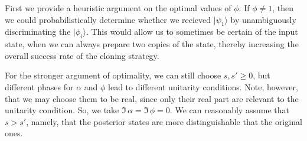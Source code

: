 \documentclass[aps,prl,twocolumn,eqsecnum,showpacs]{revtex4}
\newcommand{\ke}[1]{|#1\rangle}
\begin{document}
First we provide a heuristic argument on the optimal values of $\phi$.  If $\phi \neq 1$, then we could probabilistically determine whether we recieved $\ke{\psi_1}$ by unambiguously discriminating the $\ke {\phi_i}$.  This would allow us to sometimes be certain of the input state, when we can always prepare two copies of the state,  thereby increasing the overall success rate of the cloning strategy.

For the stronger argument of optimality, we can still choose $s,s'\ge0$, but different phases for $\alpha$ and $\phi$ lead to different unitarity conditions. Note, however, that we may choose them to be real, since only their real part are relevant to the unitarity condition. So, we take $ \Im\,\alpha=\Im\,\phi=0$. 
We can reasonably assume that $s>s'$, namely, that the posterior states are more distinguishable that the original ones.
\end{document}
